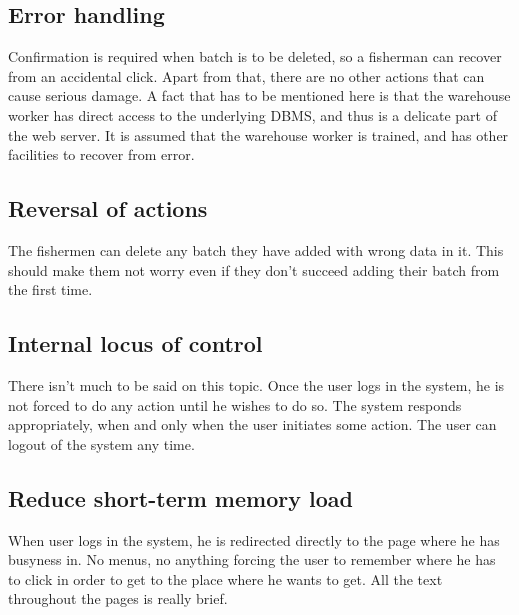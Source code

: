 \documentclass[a4paper]{article}
\begin{document}
\subsection{Error handling}
Confirmation is required when batch is to be deleted, so a fisherman can recover from an accidental click. Apart from that, there are no other actions that can cause serious damage. A fact that has to be mentioned here is that the warehouse worker has direct access to the underlying DBMS, and thus is a delicate part of the web server. It is assumed that the warehouse worker is trained, and has other facilities to recover from error.
\subsection{Reversal of actions}
The fishermen can delete any batch they have added with wrong data in it. This should make them not worry even if they don't succeed adding their batch from the first time.
\subsection{Internal locus of control}
There isn't much to be said on this topic. Once the user logs in the system, he is not forced to do any action until he wishes to do so. The system responds appropriately, when and only when the user initiates some action. The user can logout of the system any time.
\subsection{Reduce short-term memory load}
When user logs in the system, he is redirected directly to the page where he has busyness in. No menus, no anything forcing the user to remember where he has to click in order to get to the place where he wants to get. All the text throughout the pages is really brief.
\end{document}
